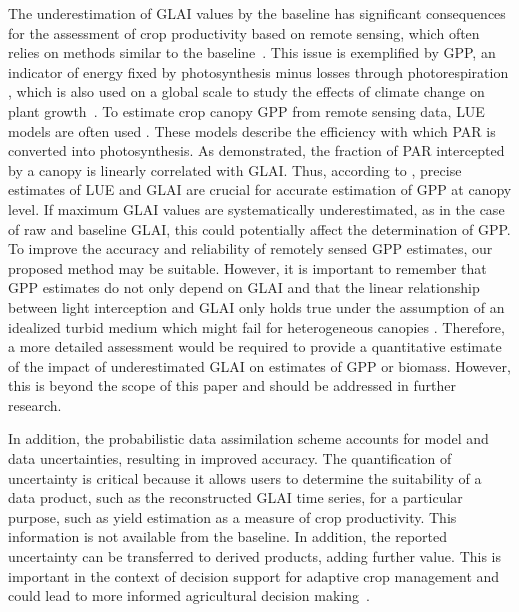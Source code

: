 The underestimation of \gls{GLAI} values by the baseline has significant consequences for the assessment of crop productivity based on remote sensing, which often relies on methods similar to the baseline~\citep{kooistra_reviews_2023}. This issue is exemplified by \gls{GPP}, an indicator of energy fixed by photosynthesis minus losses through photorespiration \citep{hilty_plant_2021}, which is also used on a global scale to study the effects of climate change on plant growth~\citep{campbell_large_2017}. To estimate crop canopy \gls{GPP} from remote sensing data, \gls{LUE} models are often used \citep[for instance]{dong_deriving_2017}. These models describe the efficiency with which \gls{PAR} is converted into photosynthesis. As \cite{monsi_factor_2004} demonstrated, the fraction of \gls{PAR} intercepted by a canopy is linearly correlated with \gls{GLAI}. Thus, according to \citet{gitelson_productivity_2015}, precise estimates of \gls{LUE} and \gls{GLAI} are crucial for accurate estimation of \gls{GPP} at canopy level. If maximum GLAI values are systematically underestimated, as in the case of raw and baseline GLAI, this could potentially affect the determination of GPP. To improve the accuracy and reliability of remotely sensed GPP estimates, our proposed method may be suitable. However, it is important to remember that \gls{GPP} estimates do not only depend on \gls{GLAI} and that the linear relationship between light interception and \gls{GLAI} only holds true under the assumption of an idealized turbid medium which might fail for heterogeneous canopies \citep{hilty_plant_2021}. Therefore, a more detailed assessment would be required to provide a quantitative estimate of the impact of underestimated \gls{GLAI} on estimates of \gls{GPP} or biomass. However, this is beyond the scope of this paper and should be addressed in further research.

In addition, the probabilistic data assimilation scheme accounts for model and data uncertainties, resulting in improved accuracy. The quantification of uncertainty is critical because it allows users to determine the suitability of a data product, such as the reconstructed \gls{GLAI} time series, for a particular purpose, such as yield estimation as a measure of crop productivity. This information is not available from the baseline. In addition, the reported uncertainty can be transferred to derived products, adding further value. This is important in the context of decision support for adaptive crop management and could lead to more informed agricultural decision making~\citep{meenken_bayesian_2021}.

